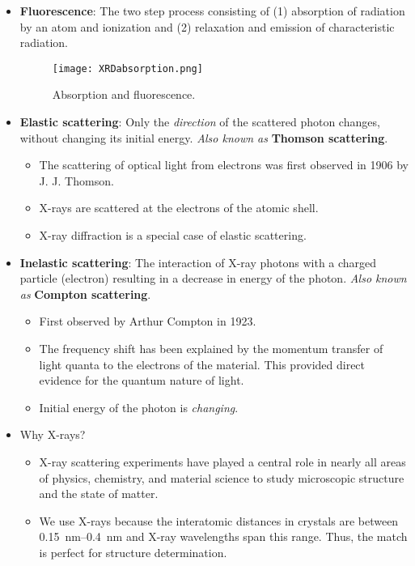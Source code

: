 \documentclass[../notes.tex]{subfiles}
\begin{document}
\begin{itemize}
\begin{itemize}
\begin{itemize}
        \end{itemize}
    \end{itemize}
    \item \textbf{Fluorescence}: The two step process consisting of (1) absorption of radiation by an atom and ionization and (2) relaxation and emission of characteristic radiation.
    \begin{figure}[h!]
        \centering
        \texttt{[image: XRDabsorption.png]}
        \caption{Absorption and fluorescence.}
        \label{fig:XRDabsorption}
    \end{figure}
    \item \textbf{Elastic scattering}: Only the \emph{direction} of the scattered photon changes, without changing its initial energy. \emph{Also known as} \textbf{Thomson scattering}.
    \begin{itemize}
        \item The scattering of optical light from electrons was first observed in 1906 by J. J. Thomson.
        \item X-rays are scattered at the electrons of the atomic shell.
        \item X-ray diffraction is a special case of elastic scattering.
    \end{itemize}
    \item \textbf{Inelastic scattering}: The interaction of X-ray photons with a charged particle (electron) resulting in a decrease in energy of the photon. \emph{Also known as} \textbf{Compton scattering}.
    \begin{itemize}
        \item First observed by Arthur Compton in 1923.
        \item The frequency shift has been explained by the momentum transfer of light quanta to the electrons of the material. This provided direct evidence for the quantum nature of light.
        \item Initial energy of the photon is \emph{changing}.
    \end{itemize}
    \item Why X-rays?
    \begin{itemize}
        \item X-ray scattering experiments have played a central role in nearly all areas of physics, chemistry, and material science to study microscopic structure and the state of matter.
        \item We use X-rays because the interatomic distances in crystals are between \SIrange{0.15}{0.4}{\nano\meter} and X-ray wavelengths span this range. Thus, the match is perfect for structure determination.

\end{itemize}
\end{itemize}
\end{document}
